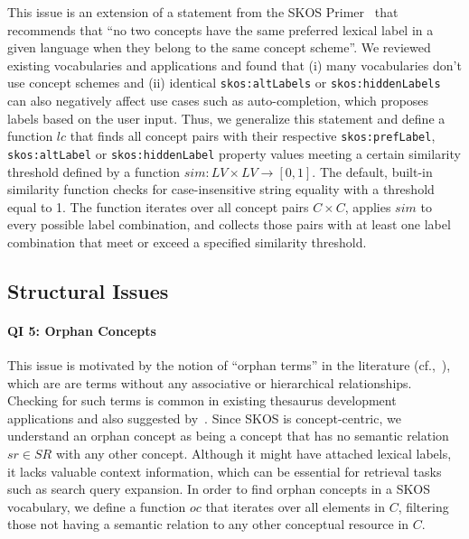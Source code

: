 This issue is an extension of a statement from the SKOS Primer~\cite{Isaac2009} that recommends that ``no two concepts have the same preferred lexical label in a given language when they belong to the same concept scheme''. We reviewed existing vocabularies and applications and found that (i) many vocabularies don't use concept schemes and (ii) identical \texttt{skos:altLabels} or \texttt{skos:hiddenLabels} can also negatively affect use cases such as auto-completion, which proposes labels based on the user input.
Thus, we generalize this statement and define a function $lc$ that finds all concept pairs with their respective \texttt{skos:prefLabel}, \texttt{skos:altLabel} or \texttt{skos:hiddenLabel} property values meeting a certain similarity threshold defined by a function $sim:LV \times LV \rightarrow [0,1]$. The default, built-in similarity function checks for case-insensitive string equality with a threshold equal to 1. The function iterates over all concept pairs $C \times C$, applies $sim$ to every possible label combination, and collects those pairs with at least one label combination that meet or exceed a specified similarity threshold.


\subsection{Structural Issues}

\paragraph{QI 5: Orphan Concepts}

This issue is motivated by the notion of ``orphan terms'' in the literature (cf.,~\cite{Hedden2010}), which are are terms without any associative or hierarchical relationships. Checking for such terms is common in existing thesaurus development applications and also suggested by~\cite{Z39.19:2005}. Since SKOS is concept-centric, we understand an orphan concept as being a concept that has no semantic relation $sr \in SR$ with any other concept. Although it might have attached lexical labels, it lacks valuable context information, which can be essential for retrieval tasks such as search query expansion.
In order to find orphan concepts in a SKOS vocabulary, we define a function $oc$ that iterates over all elements in $C$, filtering those not having a semantic relation to any other conceptual resource in $C$. 

